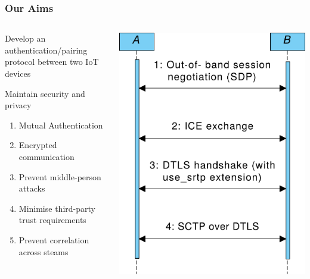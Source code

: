 \documentclass[handout, notes=hide]{beamer}
\begin{document}
\begin{frame}
\frametitle{Our Aims}

\begin{columns}[T]
\begin{column}[T]{0.6\textwidth}
\setlength{\parskip}{0.5em}

Develop an authentication/pairing protocol between two IoT devices

Maintain security and privacy

\begin{enumerate}
\item Mutual Authentication
\item Encrypted communication
\item Prevent middle-person attacks
\item Minimise third-party trust requirements
\item Prevent correlation across steams
\end{enumerate}

\end{column}
\begin{column}[T]{0.4\textwidth}
\vspace{2.5em}
\includegraphics[width=1.0\textwidth]{webrtc-simplified-thinner}
\end{column}
\end{columns}

\end{frame}
\end{document}
